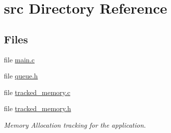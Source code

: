 \section{src Directory Reference}
\label{dir_68267d1309a1af8e8297ef4c3efbcdba}
\subsection*{Files}
\begin{DoxyCompactItemize}
\item 
file \hyperlink{main_8c}{main.\-c}
\item 
file \hyperlink{queue_8h}{queue.\-h}
\item 
file \hyperlink{tracked__memory_8c}{tracked\-\_\-memory.\-c}
\item 
file \hyperlink{tracked__memory_8h}{tracked\-\_\-memory.\-h}
\begin{DoxyCompactList}\small\item\em Memory Allocation tracking for the application. \end{DoxyCompactList}\end{DoxyCompactItemize}
